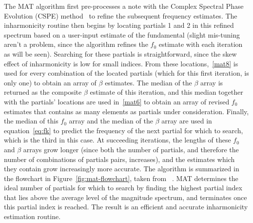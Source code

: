 \documentclass[12pt]{cmuthesis}
\begin{document}
The MAT algorithm first pre-processes a note with the Complex Spectral Phase Evolution (CSPE) method~\cite{short2006} to refine the subsequent frequency estimates. The inharmonicity routine then begins by locating partials 1 and 2 in this refined spectrum based on a user-input estimate of the fundamental (slight mis-tuning aren't a problem, since the algorithm refines the $f_0$ estimate with each iteration as will be seen). Searching for these partials is straightforward, since the skew effect of inharmonicity is low for small indices. From these locations,~\eqref{mat8} is used for every combination of the located partials (which for this first iteration, is only one) to obtain an array of $\beta$ estimates. The median of the $\beta$ array is returned as the composite $\beta$ estimate of this iteration, and this median together with the partials' locations are used in~\eqref{mat6} to obtain an array of revised $f_0$ estimates that contains as many elements as partials under consideration. Finally, the median of this $f_0$ array and the median of the $\beta$ array are used in equation~\eqref{eq:fk} to predict the frequency of the next partial for which to search, which is the third in this case. At succeeding iterations, the lengths of these $f_0$ and $\beta$ arrays grow longer (since both the number of partials, and therefore the number of combinations of partials pairs, increases), and the estimates which they contain grow increasingly more accurate. The algorithm is summarized in the flowchart in Figure~\ref{fig:mat-flowchart}, taken from ~\cite{hodgkinson2009}. MAT determines the ideal number of partials for which to search by finding the highest partial index that lies above the average level of the magnitude spectrum, and terminates once this partial index is reached. The result is an efficient and accurate inharmonicity estimation routine. 
\end{document}
